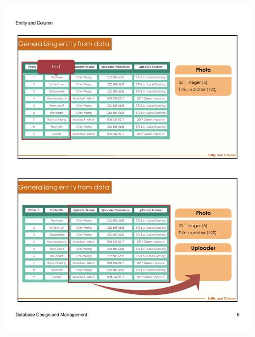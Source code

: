 \begin{frame}{ }
    \centering
    \includegraphics[width=\textwidth, trim={10mm 134mm 10mm 22mm}, clip]{resources/02/02_6}
\end{frame}
